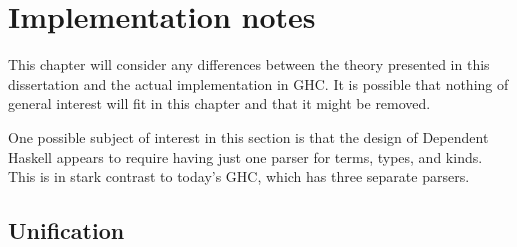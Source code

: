 \chapter{Implementation notes}
\label{cha:implementation}

\begin{proposal}
This chapter will consider any differences between the theory presented
in this dissertation and the actual implementation in GHC. It is possible
that nothing of general interest will fit in this chapter and that it might
be removed.

One possible subject of interest in this section is that the design of
Dependent Haskell appears to require having just one parser for terms,
types, and kinds. This is in stark contrast to today's GHC, which has
three separate parsers.
\end{proposal}

\section{Unification}
\label{sec:unification}
